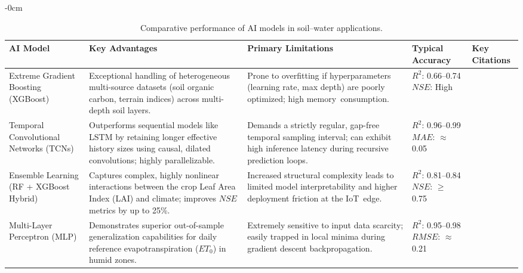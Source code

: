 \documentclass[land,review,accept,pdftex,oneauthor]{Definitions/mdpi}
\begin{document}
\begin{table}[H] 
\caption{Comparative performance of AI models in soil--water applications. \label{tab:performance}}

\footnotesize
\begin{adjustwidth}{-\extralength}{0cm}
\begin{minipage}{\fulllength}
\begin{tabularx}{\textwidth}{m{3cm}<{\raggedright}m{4.5cm}<{\raggedright}m{4.4cm}<{\raggedright}m{3cm}<{\raggedright}m{1.5cm}<{\raggedright}}

\toprule
AI Model & Key Advantages & Primary Limitations & Typical Accuracy & Key Citations \\
\midrule


Extreme Gradient Boosting (XGBoost) %
 & 
Exceptional handling of heterogeneous multi-source datasets (soil organic carbon, terrain indices) across multi-depth soil layers. & 
Prone to overfitting if hyperparameters (learning rate, max depth) are poorly optimized; high memory~consumption. & 
$R^2$: 0.66--0.74\newline $NSE$: High & 
\citep{Demir2026} \\ 
\midrule

Temporal Convolutional Networks (TCNs) & 
Outperforms sequential models like LSTM by retaining longer effective history sizes using causal, dilated convolutions; highly parallelizable. & 
Demands a strictly regular, gap-free temporal sampling interval; can exhibit high inference latency during recursive prediction loops. & 
$R^2$: 0.96--0.99\newline $MAE$: $\approx$ 0.05 & 
\citep{ScientificReports2025} \\ 
\midrule

Ensemble Learning (RF + XGBoost Hybrid) & 
Captures complex, highly nonlinear interactions between the crop Leaf Area Index (LAI) and climate; improves $NSE$ metrics by up to 25\%. & 
Increased structural complexity leads to limited model interpretability and higher deployment friction at the IoT~edge. & 
$R^2$: 0.81--0.84\newline $NSE$: $\ge$ 0.75 & 
\\ 
\midrule

Multi-Layer Perceptron (MLP) & 
Demonstrates superior out-of-sample generalization capabilities for daily reference evapotranspiration ($ET_0$) in humid zones. & 
Extremely sensitive to input data scarcity; easily trapped in local minima during gradient descent backpropagation. & 
$R^2$: 0.95--0.98\newline $RMSE$: $\approx$ 0.21 & 
\citep{Acharki2025,Veredas2026} \\
\midrule


\end{tabularx}
\end{minipage}
\end{adjustwidth}
\end{table}
\end{document}
